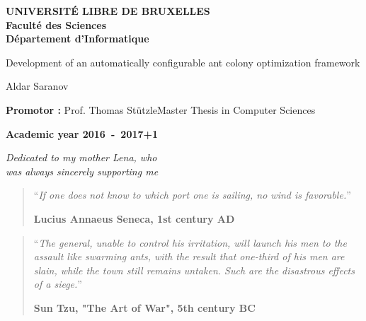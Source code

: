\documentclass[11pt,a4paper,oneside]{book}
\begin{document}
\frontmatter
\begin{titlepage}
\begin{center}
\textbf{UNIVERSIT\'E LIBRE DE BRUXELLES}\\
\textbf{Facult\'e des Sciences}\\
\textbf{D\'epartement d'Informatique}
\vfill{}\vfill{}

{\Huge  Development of an automatically configurable ant colony optimization framework}

{\Huge \par}
\begin{center}{\LARGE Aldar Saranov}\end{center}{\Huge \par}
\vfill{}\vfill{}
\begin{flushright}{\large \textbf{Promotor :} Prof. Thomas St{\"u}tzle}\hfill{}{\large Master Thesis in Computer Sciences}\\
{\large }\hfill{}{}\end{flushright}{\large\par}
\vfill{}\vfill{}\enlargethispage{3cm}
\textbf{Academic year 2016~-~2017+1}
\end{center}
\end{titlepage}
\newpage
\thispagestyle{empty} 
\null

\newenvironment{vcenterpage}
{\newpage\thispagestyle{empty} 
\vspace*{\fill}}
{\vspace*{\fill}\par\pagebreak}

\begin{vcenterpage}
\begin{flushright}
    \large\em\null\vskip1in 
    Dedicated to my mother Lena, who\\
   was always sincerely supporting me\vfill
  \end{flushright}
\end{vcenterpage}
\thispagestyle{empty}
\vspace*{5cm}

\begin{quotation}
\noindent ``\emph{If one does not know to which port one is sailing, no wind is favorable.}''
\begin{flushright}\textbf{Lucius Annaeus Seneca, 1st century AD}\end{flushright}
\end{quotation}

\medskip

\begin{quotation}
\noindent ``\emph{The general, unable to control his irritation, will launch his men
to the assault like swarming ants, with the result that one-third of
his men are slain, while the town still remains untaken. Such are
the disastrous effects of a siege.}''
\begin{flushright}\textbf{Sun Tzu, "The Art of War", 5th century BC}\end{flushright}
\end{quotation}
\end{document}
